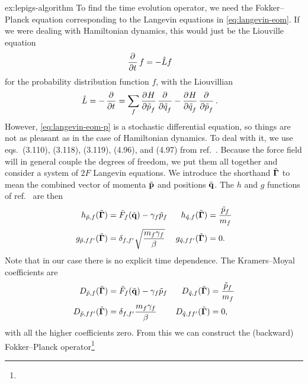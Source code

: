 \begin{DefAnswer}{ex:lepigs-algorithm}
	To find the time evolution operator, we need the Fokker--Planck equation corresponding to the Langevin equations in \cref{eq:langevin-eom}.
	If we were dealing with Hamiltonian dynamics, this would just be the Liouville equation~\cite[32]{zwanzig2001nonequilibrium}
	\begin{align}
		\dpd{}{t} f
		&= -\hat{L} f
	\end{align}
	for the probability distribution function $f$, with the Liouvillian
	\begin{align}
		\hat{L}
		&= -\dpd{}{t}
		= \sum_f \dpd{H}{\nm{p}_f} \dpd{}{\nm{q}_f} - \dpd{H}{\nm{q}_f} \dpd{}{\nm{p}_f}.
	\end{align}
	However, \cref{eq:langevin-eom-p} is a stochastic differential equation, so things are not as pleasant as in the case of Hamiltonian dynamics.
	To deal with it, we use eqs.~(3.110), (3.118), (3.119), (4.96), and (4.97) from ref.~\cite[54-55,83]{risken1984fokker}.
	Because the force field will in general couple the degrees of freedom, we put them all together and consider a system of $2 F$ Langevin equations.
	We introduce the shorthand $\tilde{\bm{\mathbf{\Gamma}}}$ to mean the combined vector of momenta $\tilde{\bm{\mathbf{p}}}$ and positions $\tilde{\bm{\mathbf{q}}}$.
	The $h$ and $g$ functions of ref.~\cite{risken1984fokker} are then
	\begin{subequations}
	\begin{align}
		h_{\tilde{p},f}(\tilde{\bm{\mathbf{\Gamma}}})
		&= \tilde{F}_f(\tilde{\bm{\mathbf{q}}}) - \gamma_f \tilde{p}_f &
		h_{\tilde{q},f}(\tilde{\bm{\mathbf{\Gamma}}})
		&= \frac{\tilde{p}_f}{m_f} \\
		g_{\tilde{p},ff'}(\tilde{\bm{\mathbf{\Gamma}}})
		&= \delta_{f,f'} \sqrt{\frac{m_f \gamma_f}{\beta}} &
		g_{\tilde{q},ff'}(\tilde{\bm{\mathbf{\Gamma}}})
		&= 0.
	\end{align}
	\end{subequations}
	Note that in our case there is no explicit time dependence.
	The Kramers--Moyal coefficients are
	\begin{subequations}
	\begin{align}
		D_{\tilde{p},f}(\tilde{\bm{\mathbf{\Gamma}}})
		&= \tilde{F}_f(\tilde{\bm{\mathbf{q}}}) - \gamma_f \tilde{p}_f &
		D_{\tilde{q},f}(\tilde{\bm{\mathbf{\Gamma}}})
		&= \frac{\tilde{p}_f}{m_f} \\
		D_{\tilde{p},ff'}(\tilde{\bm{\mathbf{\Gamma}}})
		&= \delta_{f,f'} \frac{m_f \gamma_f}{\beta} &
		D_{\tilde{q},ff'}(\tilde{\bm{\mathbf{\Gamma}}})
		&= 0,
	\end{align}
	\end{subequations}
	with all the higher coefficients zero.
	From this we can construct the (backward) Fokker--Planck operator\footnote{
}
\end{DefAnswer}
